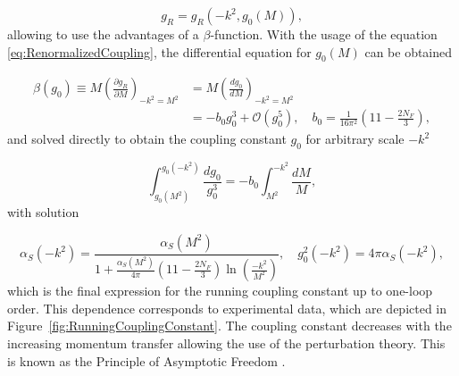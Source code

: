 \begin{equation}
  g_R = g_R(-k^2,g_0(M)),
  \label{eq:RunningCouplingConstantDependenceSchema}
\end{equation}
allowing to use the advantages of a $\beta$-function. With the usage of the
equation \eqref{eq:RenormalizedCoupling}, the differential equation for $g_0(M)$
can be obtained

\begin{align}
  \beta(g_0) \equiv M \left( \frac{\partial g_R}{\partial M} \right)_{-k^2=M^2}
  &= M \left( \frac{dg_0}{dM} \right)_{-k^2=M^2}
  \label{eq:BetaFunction1} \\
  &= -b_0 g_0^3 + \mathscr{O}(g_0^5)
  , \quad b_0 = \frac{1}{16\pi^2}\left(11-\frac{2N_F}{3}\right),
  \label{eq:BetaFunction2}
\end{align}
and solved directly to obtain the coupling constant $g_0$ for arbitrary
scale $-k^2$

\begin{equation}
  \int_{g_0(M^2)}^{g_0(-k^2)} \frac{dg_0}{g_0^3} =
  -b_0 \int_{M^2}^{-k^2}\frac{dM}{M},
  \label{eq:RunningCouplingConstantIntegralEquation}
\end{equation}
with solution

\begin{equation}
  \alpha_S(-k^2) = \frac{\alpha_S(M^2)}{1 + \frac{\alpha_S(M^2)}{4\pi} \left(
  11-\frac{2N_F}{3} \right) \ln \left( \frac{-k^2}{M^2} \right) }
  , \quad g_0^2(-k^2) = 4 \pi \alpha_S( -k^2 ),
  \label{eq:RunningCouplingConstant}
\end{equation}
which is the final expression for the running coupling constant up to one-loop
order. This dependence corresponds to experimental data, which are depicted in
Figure~\ref{fig:RunningCouplingConstant}. The coupling constant decreases with
the increasing momentum transfer allowing the use of the perturbation theory. This
is known as the Principle of Asymptotic Freedom \cite{AssymptoticFreedom}.

